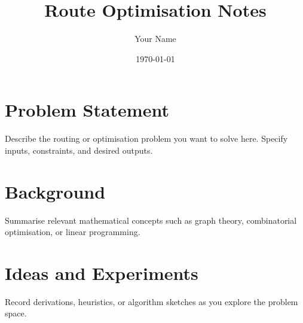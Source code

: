 \documentclass{article}
\title{Route Optimisation Notes}
\author{Your Name}
\date{\today}
\begin{document}
\maketitle

\section{Problem Statement}
Describe the routing or optimisation problem you want to solve here. Specify inputs, constraints, and desired outputs.

\section{Background}
Summarise relevant mathematical concepts such as graph theory, combinatorial optimisation, or linear programming.

\section{Ideas and Experiments}
Record derivations, heuristics, or algorithm sketches as you explore the problem space.
\end{document}
